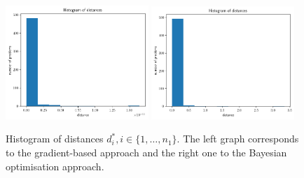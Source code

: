 \begin{figure}[h]
    \begin{center}
      \includegraphics[width=0.48\textwidth]{./Thesis/images/chapter4/ex2D_distance_hist.png}
      \includegraphics[width=0.48\textwidth]{./Thesis/images/chapter4/ex2D_distance_hist_bo.png}
    \end{center}
    \caption{Histogram of distances $d_i^*, i \in \{1, \ldots,
      n_1\}$. The left graph corresponds to the gradient-based
      approach and the right one to the Bayesian optimisation
      approach.}
  \label{fig:ex2_1}
\end{figure}


